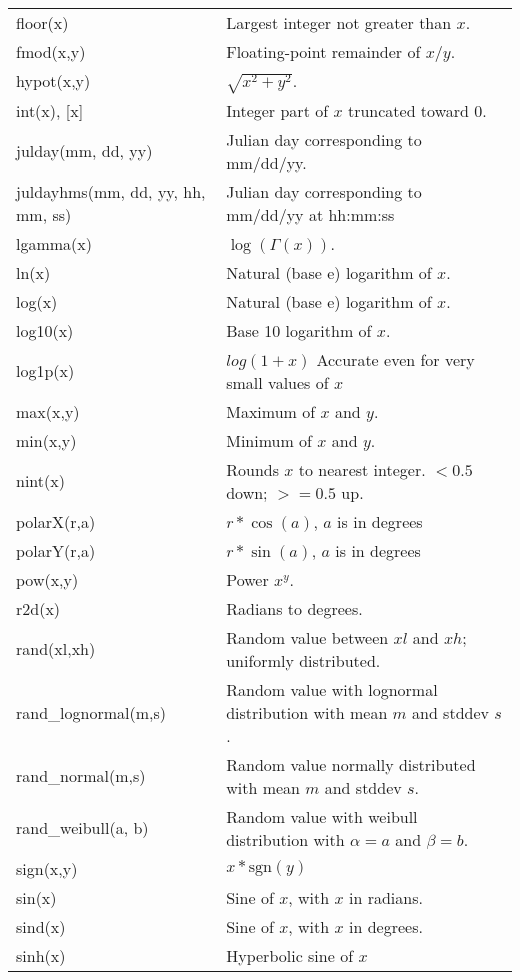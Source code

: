 \begin{longtable}{lp{4.0in}}
floor(x)            &  Largest integer not greater than $x$.\\
fmod(x,y)           &  Floating-point remainder of $x/y$.\\
hypot(x,y)          &  $\sqrt{x^2+y^2}$.\\
int(x), [x]         &  Integer part of $x$ truncated toward 0.\\
julday(mm, dd, yy)  &  Julian day corresponding to mm/dd/yy. \\
juldayhms(mm, dd, yy, hh, mm, ss)&  Julian day corresponding to mm/dd/yy at hh:mm:ss \\
lgamma(x)           &  $\log(\Gamma(x))$.\\
ln(x)               &  Natural (base e) logarithm of $x$.\\
log(x)              &  Natural (base e) logarithm of $x$.\\
log10(x)            &  Base 10 logarithm of $x$. \\
log1p(x)            &  $log(1+x)$ Accurate even for very small values of $x$\\
max(x,y)            &  Maximum of $x$ and $y$. \\
min(x,y)            &  Minimum of $x$ and $y$. \\
nint(x)             &  Rounds $x$ to nearest integer. $<0.5$ down; $>=0.5$ up.\\
polarX(r,a)         &  $r * \cos(a)$, $a$ is in degrees \\
polarY(r,a)         &  $r * \sin(a)$, $a$ is in degrees \\
pow(x,y)            &  Power $x^y$. \\
r2d(x)              &  Radians to degrees. \\
rand(xl,xh)         &  Random value between $xl$ and $xh$; uniformly distributed. \\
rand\_lognormal(m,s)&  Random value with lognormal distribution with mean $m$ and stddev $s$.\\
rand\_normal(m,s)   &  Random value normally distributed with mean $m$ and stddev $s$.\\
rand\_weibull(a, b) &  Random value with weibull distribution with $\alpha=a$ and $\beta=b$. \\
sign(x,y)           &  $x * \text{sgn}(y)$\\
sin(x)              &  Sine of $x$, with $x$ in radians. \\
sind(x)             &  Sine of $x$, with $x$ in degrees. \\
sinh(x)             &  Hyperbolic sine of $x$ \\

\end{longtable}
